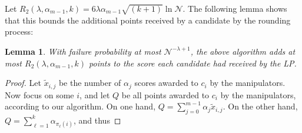 \documentclass[letterpaper]{article} %
\newtheorem{lemma}[theorem]{Lemma}
\theoremstyle{definition}
\newcommand{\NN}{\mathcal{N}}
\begin{document}
Let $R_2(\lambda, \alpha_{m-1},k)= 6\lambda\alpha_{m-1} \sqrt{(k+1)} \ln \NN $. The following lemma shows that this bounds the additional points received by a candidate by the rounding process:
\begin{lemma}\label{thr:UCM}
	With failure probability at most $\NN^{-\lambda+1}$, the above algorithm adds at most $R_2(\lambda, \alpha_{m-1},k) $ points to the score each candidate had received by the LP.
\end{lemma}
\begin{proof}
Let $\tilde{x}_{i,j}
$
be the number of $\alpha_j$ scores awarded to $c_i$ by the manipulators. Now focus on some $i$, and let $Q$ be all points awarded to $c_i$ by the manipulators, according to our algorithm. On one hand, $Q = \sum_{j=0}^{m-1} \alpha_j \tilde{x}_{i,j}$. On the other hand, $Q=\sum_{\ell=1}^{k} \alpha_{\pi_{\ell}(i)}$, and thus


\end{proof}
\end{document}
